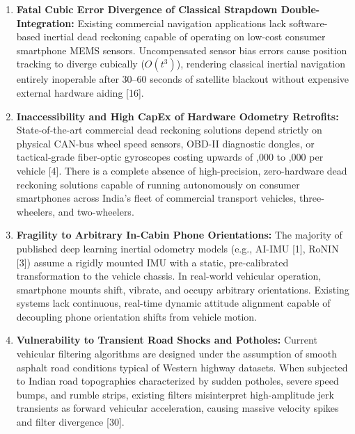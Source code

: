 \documentclass[11pt,a4paper]{article}
\begin{document}
\begin{enumerate}[label=\textbf{Gap \arabic*:},leftmargin=1.5cm,itemsep=2.0pt]
\item \textbf{Fatal Cubic Error Divergence of Classical Strapdown Double-Integration:}
Existing commercial navigation applications lack software-based inertial dead reckoning capable of operating on low-cost consumer smartphone MEMS sensors. Uncompensated sensor bias errors cause position tracking to diverge cubically ($O(t^3)$), rendering classical inertial navigation entirely inoperable after 30–60 seconds of satellite blackout without expensive external hardware aiding [16].

\item \textbf{Inaccessibility and High CapEx of Hardware Odometry Retrofits:}
State-of-the-art commercial dead reckoning solutions depend strictly on physical CAN-bus wheel speed sensors, OBD-II diagnostic dongles, or tactical-grade fiber-optic gyroscopes costing upwards of ,000 to ,000 per vehicle [4]. There is a complete absence of high-precision, zero-hardware dead reckoning solutions capable of running autonomously on consumer smartphones across India's fleet of commercial transport vehicles, three-wheelers, and two-wheelers.

\item \textbf{Fragility to Arbitrary In-Cabin Phone Orientations:}
The majority of published deep learning inertial odometry models (e.g., AI-IMU [1], RoNIN [3]) assume a rigidly mounted IMU with a static, pre-calibrated transformation to the vehicle chassis. In real-world vehicular operation, smartphone mounts shift, vibrate, and occupy arbitrary orientations. Existing systems lack continuous, real-time dynamic attitude alignment capable of decoupling phone orientation shifts from vehicle motion.

\item \textbf{Vulnerability to Transient Road Shocks and Potholes:}
Current vehicular filtering algorithms are designed under the assumption of smooth asphalt road conditions typical of Western highway datasets. When subjected to Indian road topographies characterized by sudden potholes, severe speed bumps, and rumble strips, existing filters misinterpret high-amplitude jerk transients as forward vehicular acceleration, causing massive velocity spikes and filter divergence [30].
\end{enumerate}
\newpage
\end{document}
